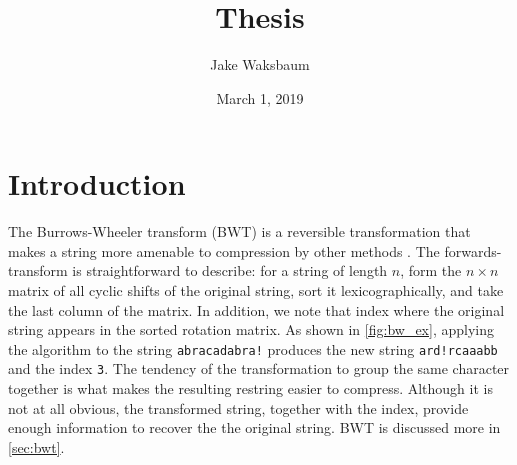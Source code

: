 \documentclass[11pt]{article}
\author{Jake Waksbaum}
\date{March 1, 2019}
\title{Thesis}
\begin{document}
\maketitle
\tableofcontents

\section{Introduction}
\label{sec:intro}

The Burrows-Wheeler transform (BWT) is a reversible transformation
that makes a string more amenable to compression by other
methods \cite{bw}. The forwards-transform is straightforward to
describe: for a string of length \(n\), form the \(n \times n\) matrix of
all cyclic shifts of the original string, sort it lexicographically,
and take the last column of the matrix. In addition, we note that
index where the original string appears in the sorted rotation matrix.
As shown in \autoref{fig:bw_ex}, applying the algorithm to the string
\verb|abracadabra!| produces the new string \verb|ard!rcaaabb| and the
index \verb|3|. The tendency of the transformation to group the same
character together is what makes the resulting restring easier to
compress. Although it is not at all obvious, the transformed string,
together with the index, provide enough information to recover the the
original string. BWT is discussed more in \autoref{sec:bwt}.
\end{document}
